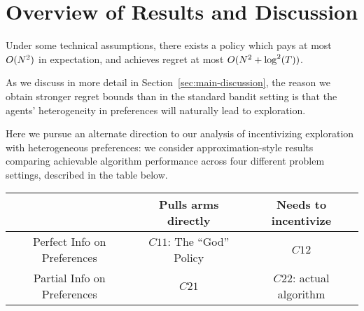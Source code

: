 \section{Overview of Results and Discussion}


\begin{theorem} \label{thm:main-intro}
Under some technical assumptions, 
there exists a policy which pays at most $O(N^2)$ in expectation,
and achieves regret at most $O(N^2 + \log^2(T))$.
\end{theorem}


As we discuss in more detail in Section~\ref{sec:main-discussion},
the reason we obtain stronger regret bounds than in the standard bandit
setting is that the agents' heterogeneity in preferences will
naturally lead to exploration.

Here we pursue an alternate direction to our analysis of incentivizing exploration with heterogeneous preferences: we consider approximation-style results comparing achievable algorithm performance across four different problem settings, described in the table below.

\begin{center}
\begin{tabular}{ c|c|c| } 
 \hline
     & Pulls arms directly & Needs to incentivize \\ 
\hline
 Perfect Info on Preferences & $C11$: The ``God'' Policy & $C12$ \\ 
 Partial Info on Preferences & $C21$ & $C22$: actual algorithm \\ 
 \hline
\end{tabular}
\end{center}

